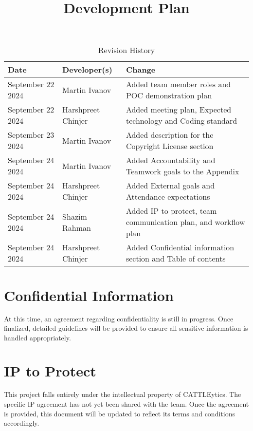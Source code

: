 \documentclass{article}
\title{Development Plan\\\progname}
\author{\authname}
\date{}
\begin{document}
\maketitle

\begin{table}[hp]
\caption{Revision History} \label{TblRevisionHistory}
\begin{tabularx}{\textwidth}{llX}
\toprule
\textbf{Date} & \textbf{Developer(s)} & \textbf{Change}\\
\midrule
September 22 2024 & Martin Ivanov & Added team member roles and POC demonstration plan\\
September 22 2024 & Harshpreet Chinjer & Added meeting plan, Expected technology and Coding standard\\
September 23 2024 & Martin Ivanov & Added description for the Copyright License section\\
September 24 2024 & Martin Ivanov & Added Accountability and Teamwork goals to the Appendix\\
September 24 2024 & Harshpreet Chinjer & Added External goals and Attendance expectations\\
September 24 2024 & Shazim Rahman & Added IP to protect, team communication plan, and workflow plan\\
September 24 2024 & Harshpreet Chinjer & Added Confidential information section and Table of contents\\
\bottomrule
\end{tabularx}
\end{table}

\newpage{}

\tableofcontents

\newpage{}

\section{Confidential Information}

At this time, an agreement regarding confidentiality is still in progress. Once finalized, detailed guidelines will be provided to ensure all sensitive information is handled appropriately.

\section{IP to Protect}
This project falls entirely under the intellectual property of CATTLEytics. The specific IP agreement has not yet been shared with the team. Once the agreement is provided, this document will be updated to reflect its terms and conditions accordingly.
\end{document}
